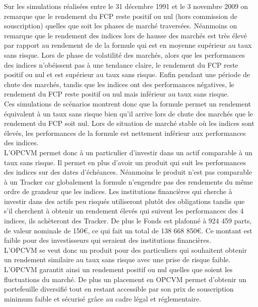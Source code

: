 \documentclass[french,12pt,a4paper]{article}
\begin{document}
\indent Sur les simulations réalisées entre le 31 décembre 1991 et le 3 novembre 2009 on remarque que le rendement du FCP reste positif ou nul (hors commission de souscription) quelles que soit les phases de marché traversées. Néanmoins on remarque que le rendement des indices lors de hausse des marchés est très élevé par rapport au rendement de de la formule qui est en moyenne supérieur au taux sans risque. Lors de phase de volatilité des marchés, alors que les performances des indices n'obéissent pas à une tendance claire, le rendement du FCP reste positif ou nul et est supérieur au taux sans risque. Enfin pendant une période de chute des marchés, tandis que les indices ont des performances négatives, le rendement du FCP reste positif ou nul mais inférieur au taux sans risque. \\
\indent Ces simulations de scénarios montrent donc que la formule permet un rendement équivalent à un taux sans risque bien qu'il arrive lors de chute des marchés que le rendement du FCP soit nul. Lors de situation de marché stable où les indices sont élevés, les performances de la formule est nettement inférieur aux performances des indices. \\
\indent L'OPCVM permet donc à un particulier d'investir dans un actif comparable à un taux sans risque. Il permet en plus d'avoir un produit qui suit les performances des indices sur des dates d'échéances. Néanmoins le produit n'est pas comparable à un Tracker car globalement la formule n'engendre pas des rendements du même ordre de grandeur que les indices. Les institutions financières qui cherche à investir dans des actifs peu risqués utiliseront plutôt des obligations tandis que s'il cherchent à obtenir un rendement élevés qui suivent les performances des 4 indices, ils achèteront des Tracker. De plus le Fonds est plafonné à 924 459 parts, de valeur nominale de 150€, ce qui fait un total de 138 668 850€. Ce montant est faible pour des investisseurs qui seraient des institutions financières.\\
\indent L'OPCVM se veut donc un produit pour des particuliers qui souhaitent obtenir un rendement similaire au taux sans risque avec une prise de risque faible. L'OPCVM garantit ainsi un rendement positif ou nul quelles que soient les fluctuations du marché. De plus un placement en OPCVM permet d'obtenir un portefeuille diversifié tout en restant accessible par son prix de souscription minimum faible et sécurisé grâce au cadre légal et réglementaire.\\
\end{document}
